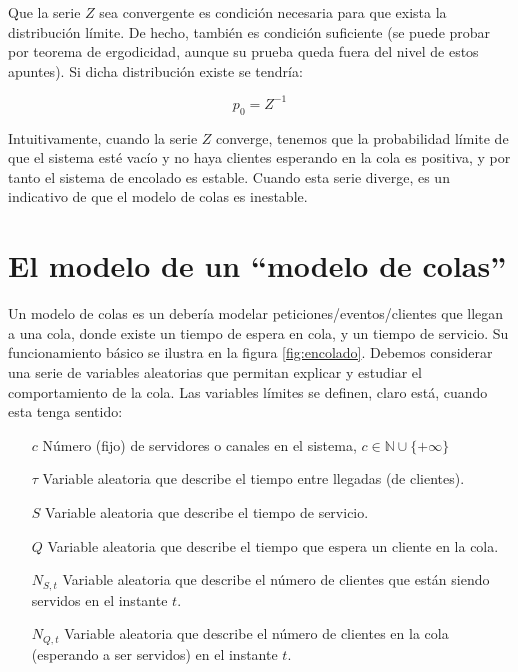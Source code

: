 \documentclass[a4paper,10pt]{scrartcl}
\theoremstyle{definition}
\numberwithin{equation}{section}
\begin{document}
Que la serie $Z$ sea convergente es condición necesaria para que exista la distribución límite. 
De hecho, también es condición suficiente (se puede probar por teorema de ergodicidad, aunque su prueba queda
fuera del nivel de estos apuntes). Si dicha distribución existe se tendría: 

\begin{equation}
 p_0 = Z^{-1} 
 \label{eq:relp0}
\end{equation}

Intuitivamente, cuando la serie $Z$ converge, tenemos que la probabilidad límite de que el 
sistema esté vacío y no haya clientes esperando en la cola es positiva, y por tanto el sistema 
de encolado es estable. Cuando esta serie diverge, es un indicativo de que el modelo de colas
es inestable.


\section{El modelo de un ``modelo de colas''}
Un modelo de colas es un debería modelar peticiones/eventos/clientes que llegan a una cola,
donde existe un tiempo de espera en cola, y un tiempo de servicio. Su funcionamiento básico se 
ilustra en la figura \ref{fig:encolado}. Debemos considerar una serie de variables aleatorias que permitan
explicar y estudiar el comportamiento de la cola. Las variables límites se definen, claro está, cuando esta 
tenga sentido:

\begin{itemize}
\item [$c$]
  Número (fijo) de servidores o canales en el sistema, $c\in \mathbb{N} \cup \{+\infty\}$
\item [$\tau$]
  Variable aleatoria que describe el tiempo entre llegadas (de clientes).
\item [$S$]
  Variable aleatoria que describe el tiempo de servicio.
\item [$Q$]
  Variable aleatoria que describe el tiempo que espera un cliente en la cola.
\item [$N_{S,t}$]
  Variable aleatoria que describe el número de clientes que están siendo servidos en el instante $t$.
\item [$N_{Q,t}$]
  Variable aleatoria que describe el número de clientes en la cola (esperando a ser servidos) en el instante $t$.
\end{itemize}
\end{document}
